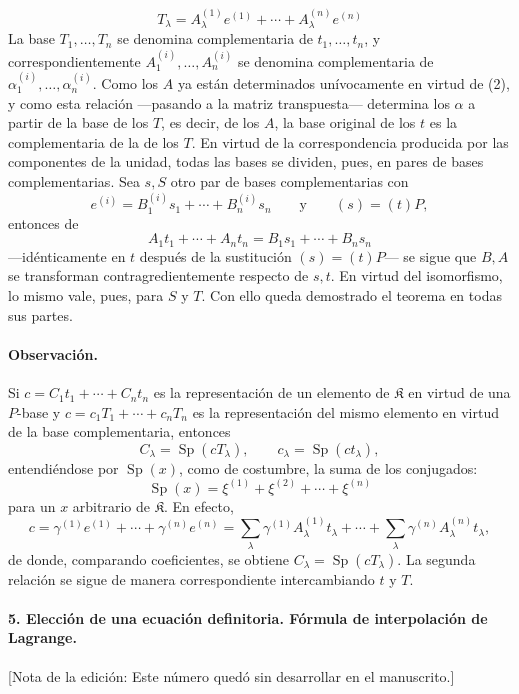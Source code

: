 \[
T_\lambda=A_\lambda^{(1)}e^{(1)}+\cdots+A_\lambda^{(n)}e^{(n)}
\]
La base $T_1,\ldots,T_n$ se denomina complementaria de $t_1,\ldots,t_n$, y correspondientemente $A_1^{(i)},\ldots,A_n^{(i)}$ se denomina complementaria de $\alpha_1^{(i)},\ldots,\alpha_n^{(i)}$. Como los $A$ ya están determinados unívocamente en virtud de (2), y como esta relación ---pasando a la matriz transpuesta--- determina los $\alpha$ a partir de la base de los $T$, es decir, de los $A$, la base original de los $t$ es la complementaria de la de los $T$. En virtud de la correspondencia producida por las componentes de la unidad, todas las bases se dividen, pues, en pares de bases complementarias. Sea $s,S$ otro par de bases complementarias con
\[
e^{(i)}=B_1^{(i)}s_1+\cdots+B_n^{(i)}s_n
\qquad\text{y}\qquad (s)=(t)P,
\]
entonces de
\[
A_1t_1+\cdots+A_nt_n=B_1s_1+\cdots+B_ns_n
\]
---idénticamente en $t$ después de la sustitución $(s)=(t)P$--- se sigue que $B,A$ se transforman contragredientemente respecto de $s,t$. En virtud del isomorfismo, lo mismo vale, pues, para $S$ y $T$. Con ello queda demostrado el teorema en todas sus partes.

\paragraph{Observación.}
Si $c=C_1t_1+\cdots+C_nt_n$ es la representación de un elemento de $\mathfrak K$ en virtud de una $P$-base y $c=c_1T_1+\cdots+c_nT_n$ es la representación del mismo elemento en virtud de la base complementaria, entonces
\[
C_\lambda=\operatorname{Sp}(cT_\lambda),
\qquad c_\lambda=\operatorname{Sp}(ct_\lambda),
\]
entendiéndose por $\operatorname{Sp}(x)$, como de costumbre, la suma de los conjugados:
\[
\operatorname{Sp}(x)=\xi^{(1)}+\xi^{(2)}+\cdots+\xi^{(n)}
\]
para un $x$ arbitrario de $\mathfrak K$. En efecto,
\[
c=\gamma^{(1)}e^{(1)}+\cdots+\gamma^{(n)}e^{(n)}
=\sum_\lambda\gamma^{(1)}A_\lambda^{(1)}t_\lambda+
\cdots+\sum_\lambda\gamma^{(n)}A_\lambda^{(n)}t_\lambda,
\]
de donde, comparando coeficientes, se obtiene $C_\lambda=\operatorname{Sp}(cT_\lambda)$. La segunda relación se sigue de manera correspondiente intercambiando $t$ y $T$.

\paragraph{5. Elección de una ecuación definitoria. Fórmula de interpolación de Lagrange.}
[Nota de la edición: Este número quedó sin desarrollar en el manuscrito.]
